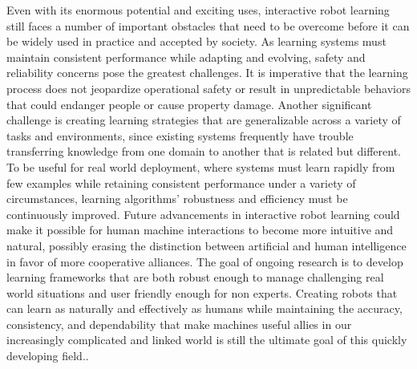 \documentclass[report.tex]{subfiles}
\begin{document}
 Even with its enormous potential and exciting uses, interactive robot learning still faces a number of important obstacles that need to be overcome before it can be widely used in practice and accepted by society.  As learning systems must maintain consistent performance while adapting and evolving, safety and reliability concerns pose the greatest challenges. It is imperative that the learning process does not jeopardize operational safety or result in unpredictable behaviors that could endanger people or cause property damage.  Another significant challenge is creating learning strategies that are generalizable across a variety of tasks and environments, since existing systems frequently have trouble transferring knowledge from one domain to another that is related but different.  To be useful for real world deployment, where systems must learn rapidly from few examples while retaining consistent performance under a variety of circumstances, learning algorithms' robustness and efficiency must be continuously improved.  Future advancements in interactive robot learning could make it possible for human machine interactions to become more intuitive and natural, possibly erasing the distinction between artificial and human intelligence in favor of more cooperative alliances.  The goal of ongoing research is to develop learning frameworks that are both robust enough to manage challenging real world situations and user friendly enough for non experts.  Creating robots that can learn as naturally and effectively as humans while maintaining the accuracy, consistency, and dependability that make machines useful allies in our increasingly complicated and linked world is still the ultimate goal of this quickly developing field..\\
 \\
\end{document}

